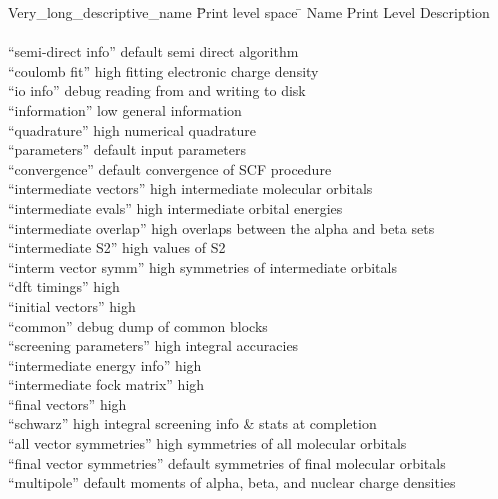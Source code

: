 \begin{tabbing}
  Very\_long\_descriptive\_name \= Print level space \= \kill
  Name                              \> Print Level \> Description \\
                                    \>             \> \\
 ``semi-direct info''               \> default     \> semi direct algorithm \\
 ``coulomb fit''                    \> high        \> fitting electronic charge density \\
 ``io info''                        \> debug       \> reading from and writing to disk  \\
 ``information''                    \> low         \> general information  \\
 ``quadrature''                     \> high        \> numerical quadrature  \\
 ``parameters''                     \> default     \> input parameters \\
 ``convergence''                    \> default     \> convergence of SCF procedure \\
 ``intermediate vectors''           \> high        \> intermediate molecular orbitals
 \\
 ``intermediate evals''             \> high        \> intermediate orbital energies \\
 ``intermediate overlap''           \> high        \> overlaps between the alpha and beta sets \\
 ``intermediate S2''                \> high        \> values of S2 \\
 ``interm vector symm''             \> high        \> symmetries of intermediate orbitals \\
 ``dft timings''                    \> high        \> \\
 ``initial vectors''                \> high        \> \\
 ``common''                         \> debug       \> dump of common blocks \\
 ``screening parameters''           \> high        \> integral accuracies \\
 ``intermediate energy info''       \> high        \> \\
 ``intermediate fock matrix''       \> high        \> \\
 ``final vectors''                  \> high        \> \\
 ``schwarz''                        \> high        \> integral screening info \&
  stats at completion\\
 ``all vector symmetries''          \> high        \> symmetries of all molecular
 orbitals \\
 ``final vector symmetries''        \> default     \> symmetries of final molecular
 orbitals \\
 ``multipole''                      \> default     \> moments of alpha, beta, and
 nuclear charge densities \\

\end{tabbing}





